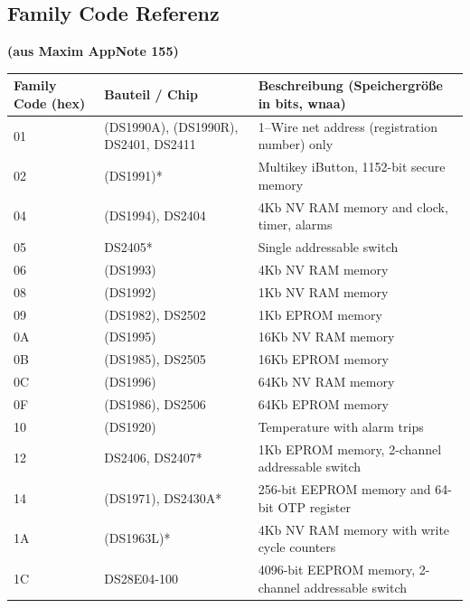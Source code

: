 {
\subsection{Family Code Referenz}
}
\textbf{(aus Maxim AppNote 155)}

\begin{center}
\begin{tabular}{|p{}|p{}|p{}|}
\hline
\textbf{Family Code (hex)}
   & \textbf{Bauteil / Chip}              & \textbf{Beschreibung \newline (Speichergröße in bits, wnaa)} \\ \hline
01 & (DS1990A), (DS1990R), DS2401, DS2411 & 1--Wire net address (registration number) only \\ \hline
02 & (DS1991)*                            & Multikey iButton, 1152-bit secure memory \\ \hline
04 & (DS1994), DS2404                     & 4Kb NV RAM memory and clock, timer, alarms \\ \hline
05 & DS2405*                              & Single addressable switch \\\hline
06 & (DS1993)                             & 4Kb NV RAM memory \\ \hline
08 & (DS1992)                             & 1Kb NV RAM memory \\ \hline
09 & (DS1982), DS2502                     & 1Kb EPROM memory \\ \hline
0A & (DS1995)                             & 16Kb NV RAM memory \\ \hline
0B & (DS1985), DS2505                     & 16Kb EPROM memory \\ \hline
0C & (DS1996)                             & 64Kb NV RAM memory \\ \hline
0F & (DS1986), DS2506                     & 64Kb EPROM memory \\ \hline
10 & (DS1920)                             & Temperature with alarm trips \\ \hline
12 & DS2406, DS2407*                      & 1Kb EPROM memory, 2-channel addressable switch \\ \hline
14 & (DS1971), DS2430A*                   & 256-bit EEPROM memory and 64-bit OTP register \\ \hline
1A & (DS1963L)*                           & 4Kb NV RAM memory with write cycle counters \\ \hline
1C & DS28E04-100                          & 4096-bit EEPROM memory, 2-channel addressable switch \\ \hline

\end{tabular}
\end{center}
